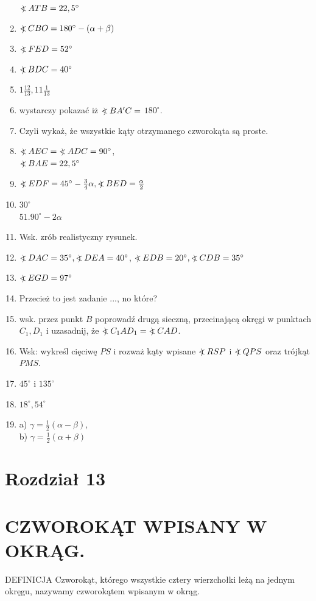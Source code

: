 \documentclass[10pt]{article}
\newcommand\Varangle{\mathop{{<\!\!\!\!\!\text{\small)}}\:}\nolimits}
\begin{document}
\begin{enumerate}
\(\Varangle A T B=22,5^{\circ}\)
  \item \(\Varangle C B O=180^{\circ}-(\alpha+\beta)\)
  \item \(\Varangle F E D=52^{\circ}\)
  \item \(\Varangle B D C=40^{\circ}\)
  \item \(1 \frac{12}{13}, 11 \frac{1}{13}\)
  \item wystarczy pokazać iż \(\Varangle B A^{\prime} C=\) \(180^{\circ}\).
  \item Czyli wykaż, że wszystkie kąty otrzymanego czworokąta są proste.
  \item \(\Varangle A E C=\Varangle A D C=90^{\circ}\),\\
\(\Varangle B A E=22,5^{\circ}\)
  \item \(\Varangle E D F=45^{\circ}-\frac{3}{4} \alpha, \Varangle B E D=\frac{\alpha}{2}\)
  \item \(30^{\circ}\)\\
\(51.90^{\circ}-2 \alpha\)
  \item Wsk. zrób realistyczny rysunek.
  \item \(\Varangle D A C=35^{\circ}, \Varangle D E A=40^{\circ}\), \(\Varangle E D B=20^{\circ}, \Varangle C D B=35^{\circ}\)
  \item \(\Varangle E G D=97^{\circ}\)
  \item Przecież to jest zadanie ..., no które?
  \item wsk. przez punkt \(B\) poprowadź drugą sieczną, przecinającą okręgi w punktach \(C_{1}, D_{1}\) i uzasadnij, że \(\Varangle C_{1} A D_{1}=\Varangle C A D\).
  \item Wsk: wykreśl cięciwę \(P S\) i rozważ kąty wpisane \(\Varangle R S P\) i \(\Varangle Q P S\) oraz trójkąt \(P M S\).
  \item \(45^{\circ}\) i \(135^{\circ}\)
  \item \(18^{\circ}, 54^{\circ}\)
  \item a) \(\gamma=\frac{1}{2}(\alpha-\beta)\),\\
b) \(\gamma=\frac{1}{2}(\alpha+\beta)\)
\end{enumerate}

\section*{Rozdział 13}
\section*{CZWOROKĄT WPISANY W OKRĄG.}
DEFINICJA Czworokąt, którego wszystkie cztery wierzchołki leżą na jednym okręgu, nazywamy czworokątem wpisanym w okrąg.
\end{document}
